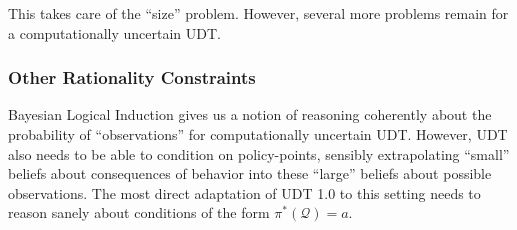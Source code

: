 \documentclass{article}
\begin{document}

This takes care of the ``size'' problem. However, several more problems remain for a computationally uncertain UDT.

\subsubsection{Other Rationality Constraints}

Bayesian Logical Induction gives us a notion of reasoning coherently about the probability of ``observations'' for computationally uncertain UDT. However, UDT also needs to be able to condition on policy-points, sensibly extrapolating ``small'' beliefs about consequences of behavior into these ``large'' beliefs about possible observations. The most direct adaptation of UDT 1.0 to this setting needs to reason sanely about conditions of the form $\pi^*(\mathcal{Q})=a$. 
\end{document}
